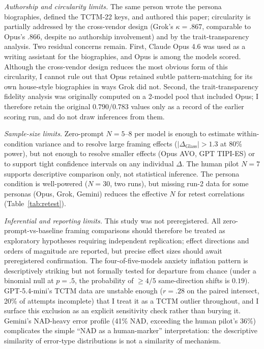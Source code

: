 \documentclass[11pt,a4paper]{article}
\begin{document}
\emph{Authorship and circularity limits.} The same person wrote the persona biographies, defined the TCTM-22 keys, and authored this paper; circularity is partially addressed by the cross-vendor design (Grok's $\kappa = .867$, comparable to Opus's $.866$, despite no authorship involvement) and by the trait-transparency analysis. Two residual concerns remain. First, Claude Opus 4.6 was used as a writing assistant for the biographies, and Opus is among the models scored. Although the cross-vendor design reduces the most obvious form of this circularity, I cannot rule out that Opus retained subtle pattern-matching for its own house-style biographies in ways Grok did not. Second, the trait-transparency fidelity analysis was originally computed on a 2-model pool that included Opus; I therefore retain the original $0.790 / 0.783$ values only as a record of the earlier scoring run, and do not draw inferences from them.

\emph{Sample-size limits.} Zero-prompt $N = 5$--$8$ per model is enough to estimate within-condition variance and to resolve large framing effects ($|\Delta_{\text{Glass}}| > 1.3$ at 80\% power), but not enough to resolve smaller effects (Opus AVO, GPT TIPI-ES) or to support tight confidence intervals on any individual $\Delta$. The human pilot $N = 7$ supports descriptive comparison only, not statistical inference. The persona condition is well-powered ($N = 30$, two runs), but missing run-2 data for some personas (Opus, Grok, Gemini) reduces the effective $N$ for retest correlations (Table~\ref{tab:retest}).

\emph{Inferential and reporting limits.} This study was not preregistered. All zero-prompt-vs-baseline framing comparisons should therefore be treated as exploratory hypotheses requiring independent replication; effect directions and orders of magnitude are reported, but precise effect sizes should await preregistered confirmation. The four-of-five-models anxiety inflation pattern is descriptively striking but not formally tested for departure from chance (under a binomial null at $p = .5$, the probability of $\geq 4 / 5$ same-direction shifts is $0.19$). GPT-5.4-mini's TCTM data are unstable enough ($r = .28$ on the paired intersect, 20\% of attempts incomplete) that I treat it as a TCTM outlier throughout, and I surface this exclusion as an explicit sensitivity check rather than burying it. Gemini's NAD-heavy error profile (41\% NAD, exceeding the human pilot's 36\%) complicates the simple ``NAD as a human-marker'' interpretation: the descriptive similarity of error-type distributions is not a similarity of mechanism.
\end{document}

